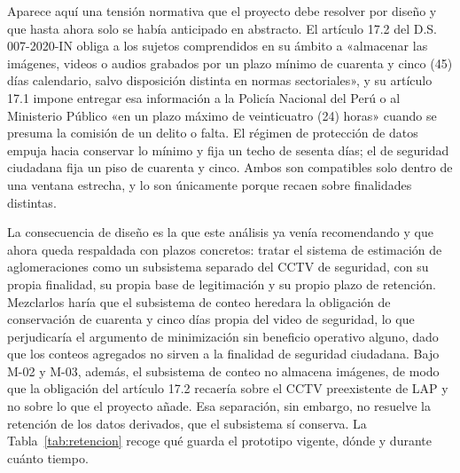 Aparece aquí una tensión normativa que el proyecto debe resolver por
diseño y que hasta ahora solo se había anticipado en abstracto. El
artículo 17.2 del D.S. 007-2020-IN obliga a los sujetos comprendidos en
su ámbito a «almacenar las imágenes, videos o audios grabados por un
plazo mínimo de cuarenta y cinco (45) días calendario, salvo disposición
distinta en normas sectoriales», y su artículo 17.1 impone entregar esa
información a la Policía Nacional del Perú o al Ministerio Público «en
un plazo máximo de veinticuatro (24) horas» cuando se presuma la
comisión de un delito o falta. El régimen de protección de datos empuja
hacia conservar lo mínimo y fija un techo de sesenta días; el de
seguridad ciudadana fija un piso de cuarenta y cinco. Ambos son
compatibles solo dentro de una ventana estrecha, y lo son únicamente
porque recaen sobre finalidades distintas.

La consecuencia de diseño es la que este análisis ya venía recomendando
y que ahora queda respaldada con plazos concretos: tratar el sistema de
estimación de aglomeraciones como un subsistema separado del CCTV de
seguridad, con su propia finalidad, su propia base de legitimación y su
propio plazo de retención. Mezclarlos haría que el subsistema de conteo
heredara la obligación de conservación de cuarenta y cinco días propia
del video de seguridad, lo que perjudicaría el argumento de minimización
sin beneficio operativo alguno, dado que los conteos agregados no sirven
a la finalidad de seguridad ciudadana. Bajo M-02 y M-03, además, el
subsistema de conteo no almacena imágenes, de modo que la obligación del
artículo 17.2 recaería sobre el CCTV preexistente de LAP y no sobre lo
que el proyecto añade. Esa separación, sin embargo, no resuelve la retención de los datos
derivados, que el subsistema sí conserva. La Tabla~\ref{tab:retencion} recoge
qué guarda el prototipo vigente, dónde y durante cuánto tiempo.

